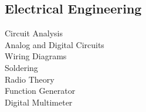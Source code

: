 \documentclass[]{deedy-resume-openfont}
\begin{document}
\begin{minipage}[t]{0.35\textwidth}
\iffalse %
\subsection{Manufacturing}
- Lean Six Sigma \\
- TPM | 5S \\
- Continuous Improvement \\
- Preventative Maintenance \\
- Process Improvement \\
- Operations Management \\
- Leadership | Supervision \\
- Electrical Wiring \\
- Supply Chain \\
- Production Scheduling \\
\sectionsep
\fi %


\subsection{Electrical Engineering}
Circuit Analysis \\
Analog and Digital Circuits \\
Wiring Diagrams \\
Soldering \\
Radio Theory \\
Function Generator \\
Digital Multimeter\\ 
\sectionsep

\iffalse %
\subsection{Avionics}
Circuit Analysis \\
Analog and Digital Circuits \\
AC Wiring Diagrams \\
Soldering \\
Antenna/Radio Theory \\
Systems Troubleshooting \\
Electrical Harness Design \\
Navigation Systems \\
Function Generator \\
Digital Multimeter\\ 
\sectionsep
\fi %



\end{minipage}
\end{document}
